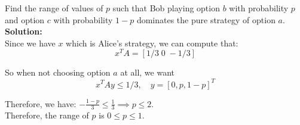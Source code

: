 \documentclass{article}
\begin{document}
Find the range of values of $p$ such that Bob playing option $b$ with probability $p$ and option $c$ with probability $1 - p$ dominates the pure strategy of option $a$. \\

\textbf{Solution: } \\

Since we have $x$ which is Alice's strategy, we can compute that: $$x^T A = [1/3 \; 0 \; -1/3]$$

So when not choosing option $a$ at all, we want $$x^T Ay \leq 1/3, \quad y = [0, p, 1-p]^T$$

Therefore, we have: $-\frac{1-p}{3} \leq \frac{1}{3} \implies p \leq 2$. \\

Therefore, the range of $p$ is $0 \leq p \leq 1$.
\end{document}
